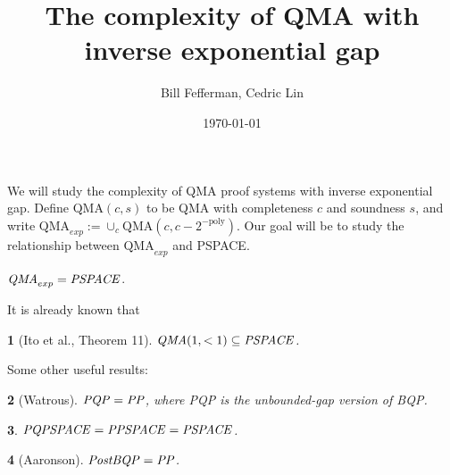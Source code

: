 \documentclass[english]{article}
\numberwithin{equation}{section}
\numberwithin{figure}{section}
\theoremstyle{plain}
\newtheorem{thm}{\protect\theoremname}
\theoremstyle{definition}
\theoremstyle{plain}
\theoremstyle{definition}
\theoremstyle{remark}
\theoremstyle{remark}
\theoremstyle{plain}
\providecommand{\theoremname}{Theorem}
\begin{document}
\title{The complexity of QMA with inverse exponential gap}
\author{Bill Fefferman, Cedric Lin}
\date{\today}
\maketitle
%

We will study the complexity of QMA proof systems with inverse exponential gap. Define $\text{QMA}(c,s)$ to be QMA with completeness $c$ and soundness $s$, and write $\text{QMA}_{exp} := \cup_{c}\text{QMA}(c,c-2^{-\text{poly}})$. Our goal  will be to study the relationship between $\text{QMA}_{exp}$ and PSPACE.

\begin{con}
$\text{\emph{QMA}}_{exp}=\text{\emph{PSPACE}}$.
\end{con}

It is already known that
\begin{thm}[Ito et al., Theorem 11] 
$\text{\emph{QMA}}(1,<1)\subseteq\text{\emph{PSPACE}}$.
\end{thm}
Some other useful results:
\begin{thm}[Watrous]
$\text{\emph{PQP}} = \text{\emph{PP}}$, where \emph{PQP} is the unbounded-gap version of \emph{BQP}.
\end{thm}
\begin{thm}
$\text{\emph{PQPSPACE}} = \text{\emph{PPSPACE}} = \text{\emph{PSPACE}} $.
\end{thm}
\begin{thm}[Aaronson]
$\text{\emph{PostBQP}} = \text{\emph{PP}}$.
\end{thm}
\end{document}
